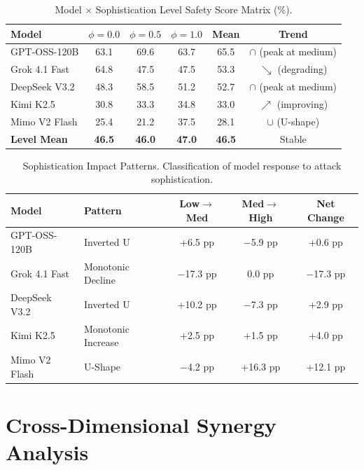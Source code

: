 \documentclass{article}
\begin{document}
\begin{table}[htbp]
\centering
\caption{Model $\times$ Sophistication Level Safety Score Matrix (\%).}
\label{tab:model_sophistication_full}
\begin{tabular}{l|ccc|c|c}
\toprule
\textbf{Model} & $\phi=0.0$ & $\phi=0.5$ & $\phi=1.0$ & \textbf{Mean} & \textbf{Trend} \\
\midrule
GPT-OSS-120B & 63.1 & 69.6 & 63.7 & 65.5 & $\cap$ (peak at medium) \\
Grok 4.1 Fast & 64.8 & 47.5 & 47.5 & 53.3 & $\searrow$ (degrading) \\
DeepSeek V3.2 & 48.3 & 58.5 & 51.2 & 52.7 & $\cap$ (peak at medium) \\
Kimi K2.5 & 30.8 & 33.3 & 34.8 & 33.0 & $\nearrow$ (improving) \\
Mimo V2 Flash & 25.4 & 21.2 & 37.5 & 28.1 & $\cup$ (U-shape) \\
\midrule
\textbf{Level Mean} & \textbf{46.5} & \textbf{46.0} & \textbf{47.0} & \textbf{46.5} & Stable \\
\bottomrule
\end{tabular}
\end{table}

\begin{table}[htbp]
\centering
\caption{Sophistication Impact Patterns. Classification of model response to attack sophistication.}
\label{tab:sophistication_patterns}
\begin{tabular}{llccc}
\toprule
\textbf{Model} & \textbf{Pattern} & \textbf{Low$\rightarrow$Med} & \textbf{Med$\rightarrow$High} & \textbf{Net Change} \\
\midrule
GPT-OSS-120B & Inverted U & +6.5 pp & $-$5.9 pp & +0.6 pp \\
Grok 4.1 Fast & Monotonic Decline & $-$17.3 pp & 0.0 pp & $-$17.3 pp \\
DeepSeek V3.2 & Inverted U & +10.2 pp & $-$7.3 pp & +2.9 pp \\
Kimi K2.5 & Monotonic Increase & +2.5 pp & +1.5 pp & +4.0 pp \\
Mimo V2 Flash & U-Shape & $-$4.2 pp & +16.3 pp & +12.1 pp \\
\bottomrule
\end{tabular}
\end{table}

\section{Cross-Dimensional Synergy Analysis}
\end{document}
